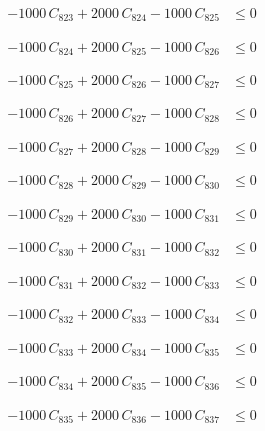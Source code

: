 \documentclass[a4paper,11pt]{article}
\begin{document}
\begin{align}
-1000\,C_{823} + 2000\,C_{824} - 1000\,C_{825} &\leq 0 \nonumber
\end{align}

\begin{align}
-1000\,C_{824} + 2000\,C_{825} - 1000\,C_{826} &\leq 0 \nonumber
\end{align}

\begin{align}
-1000\,C_{825} + 2000\,C_{826} - 1000\,C_{827} &\leq 0 \nonumber
\end{align}

\begin{align}
-1000\,C_{826} + 2000\,C_{827} - 1000\,C_{828} &\leq 0 \nonumber
\end{align}

\begin{align}
-1000\,C_{827} + 2000\,C_{828} - 1000\,C_{829} &\leq 0 \nonumber
\end{align}

\begin{align}
-1000\,C_{828} + 2000\,C_{829} - 1000\,C_{830} &\leq 0 \nonumber
\end{align}

\begin{align}
-1000\,C_{829} + 2000\,C_{830} - 1000\,C_{831} &\leq 0 \nonumber
\end{align}

\begin{align}
-1000\,C_{830} + 2000\,C_{831} - 1000\,C_{832} &\leq 0 \nonumber
\end{align}

\begin{align}
-1000\,C_{831} + 2000\,C_{832} - 1000\,C_{833} &\leq 0 \nonumber
\end{align}

\begin{align}
-1000\,C_{832} + 2000\,C_{833} - 1000\,C_{834} &\leq 0 \nonumber
\end{align}

\begin{align}
-1000\,C_{833} + 2000\,C_{834} - 1000\,C_{835} &\leq 0 \nonumber
\end{align}

\begin{align}
-1000\,C_{834} + 2000\,C_{835} - 1000\,C_{836} &\leq 0 \nonumber
\end{align}

\begin{align}
-1000\,C_{835} + 2000\,C_{836} - 1000\,C_{837} &\leq 0 \nonumber
\end{align}
\end{document}

